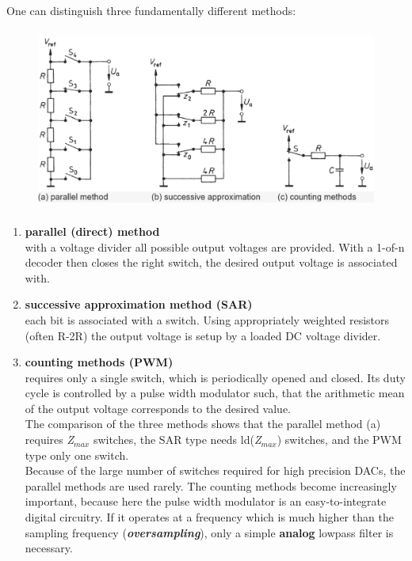 One can distinguish three fundamentally different methods:

    \begin{figure}[h]
    \centering
    \includegraphics[width=14cm, height=6cm]{Images/image31.png}
    \label{fig:Fig 118}
    \end{figure}
\begin{enumerate}
\newpage
\item \textbf{parallel (direct) method}\\

with a voltage divider all possible output voltages are provided. With a 1-of-n decoder then closes the right switch, the desired output voltage is associated with.

\item \textbf{successive approximation method (SAR)}\\

each bit is associated with a switch. Using appropriately weighted resistors (often R-2R) the output voltage is setup by a loaded DC voltage divider.

\item \textbf{counting methods (PWM)}\\

requires only a single switch, which is periodically opened and closed. Its duty cycle is controlled by a pulse width modulator such, that the arithmetic mean of the output voltage corresponds to the desired value.\\

The comparison of the three methods shows that the parallel method (a) requires \textit{Z${}_{max}$} switches, the SAR type needs ld(\textit{Z${}_{max}$}) switches, and the PWM type only one switch. \\

Because of the large number of switches required for high precision DACs, the parallel methods are used rarely. The counting methods become increasingly important, because here the pulse width modulator is an easy-to-integrate digital circuitry. If it operates at a frequency which is much higher than the sampling frequency (\textbf{\textit{oversampling}}), only a simple \textbf{analog} lowpass filter is necessary.
\end{enumerate}
\newpage
